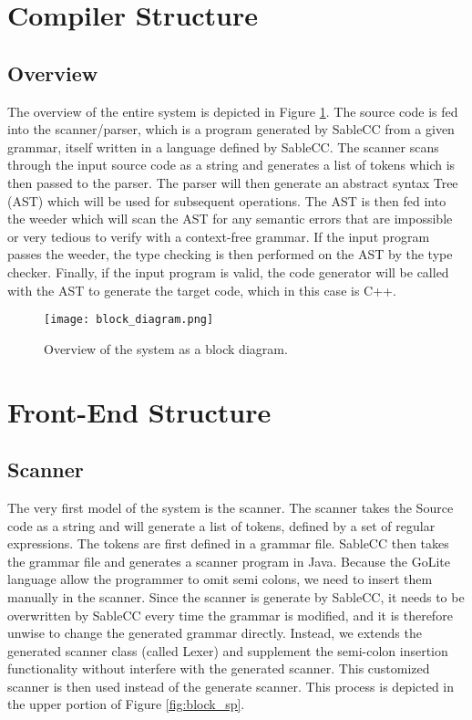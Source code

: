 \documentclass[a4paper]{article}
\begin{document}
\section{Compiler Structure}

\subsection{Overview}

The overview of the entire system is depicted in Figure \ref{fig:block_system}. The source code is fed into the scanner/parser, which is a program generated by SableCC from a given grammar, itself written in a language defined by SableCC. The scanner scans through the input source code as  a string and generates a list of tokens which is then passed to the parser. The parser will then generate an abstract syntax Tree (AST) which will be used for subsequent operations. The AST is then fed into the weeder which will scan the AST for any semantic errors that are impossible or very tedious to verify with a context-free grammar. If the input program passes the weeder, the type checking is then performed on the AST by the type checker. Finally, if the input program is valid, the code generator will be called with the AST to generate the target code, which in this case is C++. 

\begin{figure}
\centering
\texttt{[image: block\_diagram.png]}
\caption{\label{fig:block_system}Overview of the system as a block diagram.}
\end{figure}

\section{Front-End Structure}

\subsection{Scanner}
The very first model of the system is the scanner. The scanner takes the Source code as a string and will generate a list of tokens, defined by a set of regular expressions. The tokens are first defined in a grammar file. SableCC then takes the grammar file and generates a scanner program in Java. Because the GoLite language allow the programmer to omit semi colons, we need to insert them manually in the scanner. Since the scanner is generate by SableCC, it needs to be overwritten by SableCC every time the grammar is modified, and it is therefore unwise to change the generated grammar directly. Instead, we extends the generated scanner class (called Lexer) and supplement the semi-colon insertion functionality without interfere with the generated scanner. This customized scanner is then used instead of the generate scanner. This process is depicted in the upper portion of Figure \ref{fig:block_sp}.
\end{document}
